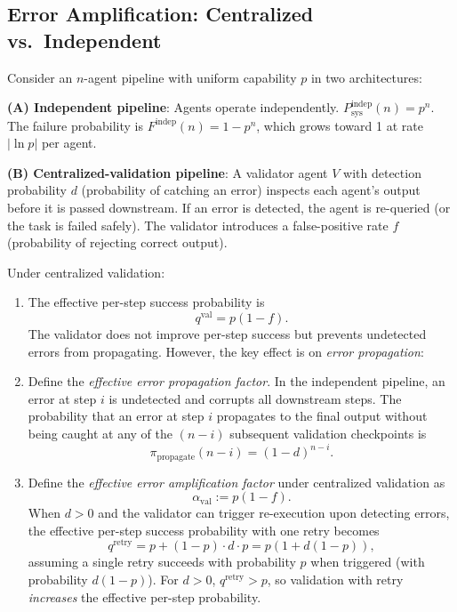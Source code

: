 \subsection{Error Amplification: Centralized vs.\ Independent}

\begin{theorem}
\label{thm:centralized-validation}
Consider an $n$-agent pipeline with uniform capability $p$ in two architectures:

\medskip\noindent\textbf{(A) Independent pipeline}: Agents operate independently.
$P_{\mathrm{sys}}^{\mathrm{indep}}(n) = p^n$. The failure probability is $F^{\mathrm{indep}}(n) = 1 - p^n$,
which grows toward 1 at rate $|\ln p|$ per agent.

\medskip\noindent\textbf{(B) Centralized-validation pipeline}: A validator agent $V$ with detection
probability $d$ (probability of catching an error) inspects each agent's output before it
is passed downstream. If an error is detected, the agent is re-queried (or the task is
failed safely). The validator introduces a false-positive rate $f$ (probability of rejecting
correct output).

Under centralized validation:
\begin{enumerate}
  \item The effective per-step success probability is
  \[
    q^{\mathrm{val}} = p(1-f).
  \]
  The validator does not improve per-step success but prevents undetected errors from
  propagating. However, the key effect is on \emph{error propagation}:

  \item Define the \emph{effective error propagation factor}. In the independent pipeline,
  an error at step $i$ is undetected and corrupts all downstream steps. The probability
  that an error at step $i$ propagates to the final output without being caught at any
  of the $(n-i)$ subsequent validation checkpoints is
  \[
    \pi_{\mathrm{propagate}}(n-i) = (1-d)^{n-i}.
  \]

  \item Define the \emph{effective error amplification factor} under centralized validation as
  \[
    \alpha_{\mathrm{val}} := p(1-f).
  \]
  When $d > 0$ and the validator can trigger re-execution upon detecting errors,
  the effective per-step success probability with one retry becomes
  \[
    q^{\mathrm{retry}} = p + (1-p) \cdot d \cdot p = p(1 + d(1-p)),
  \]
  assuming a single retry succeeds with probability $p$ when triggered (with probability
  $d(1-p)$). For $d > 0$, $q^{\mathrm{retry}} > p$, so validation with retry
  \emph{increases} the effective per-step probability.


\end{enumerate}
\end{theorem}
